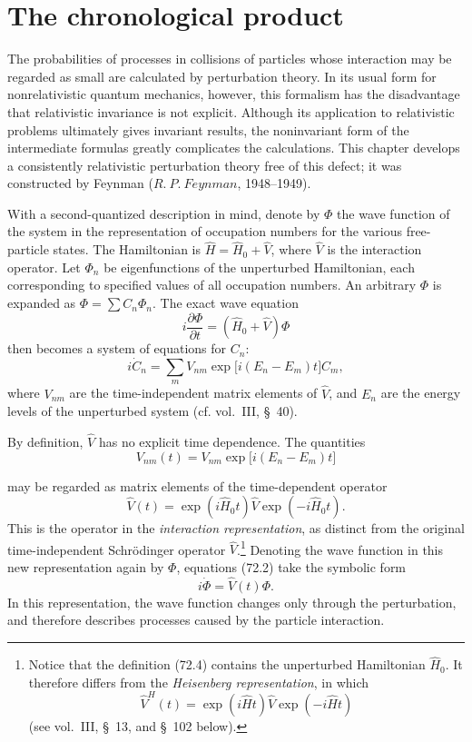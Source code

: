 \section{The chronological product}

The probabilities of processes in collisions of particles whose interaction may be regarded as small are calculated by perturbation theory. In its usual form for nonrelativistic quantum mechanics, however, this formalism has the disadvantage that relativistic invariance is not explicit. Although its application to relativistic problems ultimately gives invariant results, the noninvariant form of the intermediate formulas greatly complicates the calculations. This chapter develops a consistently relativistic perturbation theory free of this defect; it was constructed by Feynman ($R.~P.~Feynman$, 1948--1949).

With a second-quantized description in mind, denote by $\Phi$ the wave function of the system in the representation of occupation numbers for the various free-particle states. The Hamiltonian is $\hat H=\hat H_0+\hat V$, where $\hat V$ is the interaction operator. Let $\Phi_n$ be eigenfunctions of the unperturbed Hamiltonian, each corresponding to specified values of all occupation numbers. An arbitrary $\Phi$ is expanded as $\Phi=\sum C_n\Phi_n$. The exact wave equation
\begin{equation}
i\frac{\partial\Phi}{\partial t}=(\hat H_0+\hat V)\Phi
\tag{72.1}
\end{equation}
then becomes a system of equations for $C_n$:
\begin{equation}
i\dot C_n=\sum_m V_{nm}\exp\bigl[i(E_n-E_m)t\bigr]C_m,
\tag{72.2}
\end{equation}
where $V_{nm}$ are the time-independent matrix elements of $\hat V$, and $E_n$ are the energy levels of the unperturbed system (cf. vol.~III, \S~40).

By definition, $\hat V$ has no explicit time dependence. The quantities
\begin{equation}
V_{nm}(t)=V_{nm}\exp\bigl[i(E_n-E_m)t\bigr]
\tag{72.3}
\end{equation}

may be regarded as matrix elements of the time-dependent operator
\begin{equation}
\hat V(t)=\exp(i\hat H_0t)\hat V\exp(-i\hat H_0t).
\tag{72.4}
\end{equation}
This is the operator in the \emph{interaction representation}, as distinct from the original time-independent Schrödinger operator $\hat V$.\footnote{Notice that the definition (72.4) contains the unperturbed Hamiltonian $\hat H_0$. It therefore differs from the \emph{Heisenberg representation}, in which
\[
\hat V^H(t)=\exp(i\hat Ht)\hat V\exp(-i\hat Ht)
\]
(see vol.~III, \S~13, and \S~102 below).} Denoting the wave function in this new representation again by $\Phi$, equations (72.2) take the symbolic form
\begin{equation}
i\dot\Phi=\hat V(t)\Phi.
\tag{72.5}
\end{equation}
In this representation, the wave function changes only through the perturbation, and therefore describes processes caused by the particle interaction.

